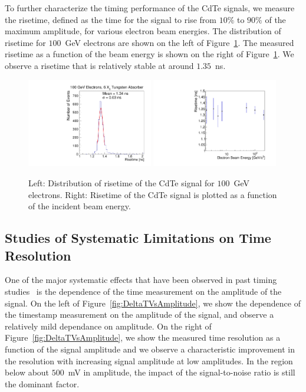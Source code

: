 To further characterize the timing performance of the CdTe signals, we measure the
risetime, defined as the time for the signal to rise from $10\%$ to $90\%$ of the maximum
amplitude, for various electron beam energies. The distribution of risetime for
$100$~GeV electrons are shown on the left of Figure~\ref{fig:riseTime}. The 
measured risetime as a function of the beam energy is shown on the right of 
Figure~\ref{fig:riseTime}. We observe a risetime that is relatively stable
at around $1.35$~ns.


\begin{figure}[htbp] 
\centering
\includegraphics[width=0.49\textwidth]{figures/100GeV_risetime.pdf} 
\includegraphics[width=0.49\textwidth]{figures/RisetimeVsEnergy.pdf} 
\caption{ Left: Distribution of risetime of the CdTe signal for $100$~GeV electrons. 
Right: Risetime of the CdTe signal is plotted as a function of the incident beam energy. } 
\label{fig:riseTime} 
\end{figure} 



\subsection{Studies of Systematic Limitations on Time Resolution}
\label{sec:systematicLimitations}

One of the major systematic effects that have been observed in past
timing studies~\cite{Anderson:2015gha,Ronzhin:2015pba,MCPShowerMaxPaper} is the dependence 
of the time measurement on the amplitude of the signal. On the left of 
Figure~\ref{fig:DeltaTVsAmplitude}, we show the dependence of the timestamp measurement 
on the amplitude of the signal, and observe a relatively mild dependance on amplitude.
On the right of Figure~\ref{fig:DeltaTVsAmplitude}, we show the measured time resolution
as a function of the signal amplitude and we observe a characteristic improvement
in the resolution with increasing signal amplitude at low amplitudes. In the region
below about $500$~mV in amplitude, the impact of the signal-to-noise ratio is still 
the dominant factor.

